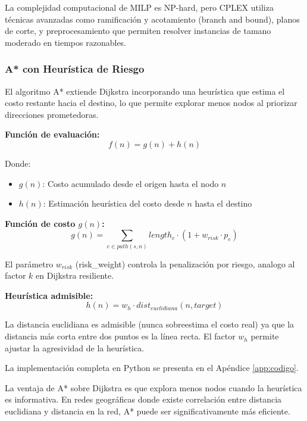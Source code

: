 \documentclass[conference]{IEEEtran}
\begin{document}
La complejidad computacional de MILP es NP-hard, pero CPLEX utiliza técnicas avanzadas como ramificación y acotamiento (branch and bound), planos de corte, y preprocesamiento que permiten resolver instancias de tamano moderado en tiempos razonables.

\subsubsection{A* con Heurística de Riesgo}

El algoritmo A* extiende Dijkstra incorporando una heurística que estima el costo restante hacia el destino, lo que permite explorar menos nodos al priorizar direcciones prometedoras.

\textbf{Función de evaluación:}
\begin{equation}
f(n) = g(n) + h(n)
\end{equation}

Donde:
\begin{itemize}
    \item $g(n)$: Costo acumulado desde el origen hasta el nodo $n$
    \item $h(n)$: Estimación heurística del costo desde $n$ hasta el destino
\end{itemize}

\textbf{Función de costo $g(n)$:}
\begin{equation}
g(n) = \sum_{e \in path(s,n)} length_e \cdot (1 + w_{risk} \cdot p_e)
\end{equation}

El parámetro $w_{risk}$ (risk\_weight) controla la penalización por riesgo, analogo al factor $k$ en Dijkstra resiliente.

\textbf{Heurística admisible:}
\begin{equation}
h(n) = w_h \cdot dist_{euclidiana}(n, target)
\end{equation}

La distancia euclidiana es admisible (nunca sobreestima el costo real) ya que la distancia más corta entre dos puntos es la línea recta. El factor $w_h$ permite ajustar la agresividad de la heurística.

La implementación completa en Python se presenta en el Apéndice \ref{app:codigo}.

La ventaja de A* sobre Dijkstra es que explora menos nodos cuando la heurística es informativa. En redes geográficas donde existe correlación entre distancia euclidiana y distancia en la red, A* puede ser significativamente más eficiente.
\end{document}
